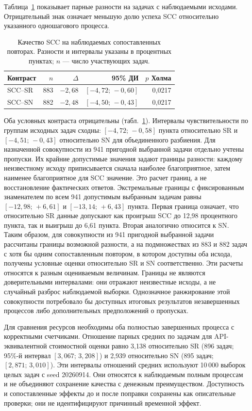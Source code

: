 Таблица~\ref{tab:scc-quality} показывает парные разности на задачах с наблюдаемыми исходами. Отрицательный знак означает меньшую долю успеха SCC относительно указанного одношагового процесса.
\begin{table}[H]
\caption{Качество SCC на наблюдаемых сопоставленных повторах. Разности и интервалы указаны в процентных пунктах; $n$ --- число участвующих задач.}
\label{tab:scc-quality}
\centering\small
\begin{tabular}{@{}lrrrr@{}}
\toprule
Контраст & $n$ & $\Delta$ & 95\% ДИ & $p$ Холма\\
\midrule
SCC--SR & 883 & $-2{,}68$ & $[-4{,}72;\,-0{,}60]$ & 0,0217\\
SCC--SN & 882 & $-2{,}48$ & $[-4{,}50;\,-0{,}43]$ & 0,0217\\
\bottomrule
\end{tabular}
\end{table}

Оба условных контраста отрицательны (табл.~\ref{tab:scc-quality}). Интервалы чувствительности по группам исходных задач сходны: $[-4{,}72;\,-0{,}58]$ пункта относительно SR и $[-4{,}51;\,-0{,}43]$ относительно SN для объединенного разбиения. Для назначенной совокупности из 941 пригодной выбранной задачи отдельно учтены пропуски. Их крайние допустимые значения задают границы разности: каждому неизвестному исходу приписывается сначала наиболее благоприятное, затем наименее благоприятное для SCC значение. Это расчет границ, а не восстановление фактических ответов. Экстремальные границы с фиксированным знаменателем по всем 941 допустимым выбранным задачам равны $[-12{,}98;\,+6{,}61]$ и $[-13{,}14;\,+6{,}43]$ пункта. Первая граница означает, что относительно SR данные допускают как проигрыш SCC до 12,98 процентного пункта, так и выигрыш до 6,61 пункта. Вторая аналогично относится к SN. Таким образом, для совокупности из 941 пригодной выбранной задачи рассчитаны границы возможной разности, а на подмножествах из 883 и 882 задач с хотя бы одним сопоставленным повтором, в котором доступны оба исхода, получены условные оценки относительно SR и SN соответственно. Эти расчеты относятся к разным оцениваемым величинам. Границы не являются доверительными интервалами: они отражают неизвестные исходы, а не случайный разброс наблюдаемой выборки. Однозначное ранжирование этой совокупности потребовало бы доступных итоговых результатов незавершенных процессов либо дополнительных предположений о пропусках.

Для сравнения ресурсов необходимы оба полностью завершенных процесса с корректными счетчиками. Отношение парных средних по задачам для API-эквивалентной стоимостной оценки равно 3,138 относительно SR (896 задач; 95\%-й интервал $[3{,}067;\,3{,}208]$) и 2,939 относительно SN (895 задач; $[2{,}871;\,3{,}010]$). Эти интервалы отношений средних используют 10\,000 выборок целых задач с seed 20260914. Они относятся к наблюдаемым полным процессам и не объединяют сохранение качества с денежным преимуществом. Доступность и сопоставленные эффекты до и после поправки сохранены как описательные проверки; они не идентифицируют причинный временной эффект.

